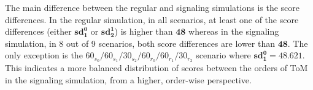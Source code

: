 The main difference between the regular and signaling simulations is the score differences. In the regular simulation, in all scenarios, at least one of the score differences (either $\mathbf{sd^0_1}$ or $\mathbf{sd^1_2}$) is higher than $\mathbf{48}$ whereas in the signaling simulation, in 8 out of 9 scenarios, both score differences are lower than $\mathbf{48}$. The only exception is the $60_{s_{0}}/60_{s_{1}}/30_{s_{2}}/60_{r_{0}}/60_{r_{1}}/30_{r_{2}}$ scenario where $\mathbf{sd^0_1 = 48.621}$. This indicates a more balanced distribution of scores between the orders of ToM in the signaling simulation, from a higher, order-wise perspective.